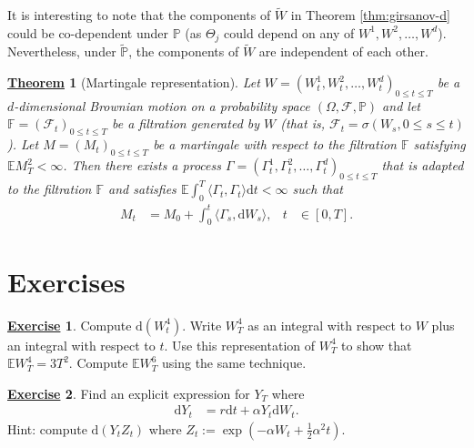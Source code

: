 \documentclass[12pt]{book}
\numberwithin{equation}{chapter}
\theoremstyle{plain}
\newtheorem{theorem}{\underline{Theorem}}
\numberwithin{theorem}{section}
\theoremstyle{definition}
\newtheorem{exercise}{\underline{Exercise}}
\numberwithin{exercise}{chapter}
\newcommand{\<}{\langle}
\renewcommand{\>}{\rangle}
\renewcommand{\(}{\left(}
\renewcommand{\)}{\right)}
\renewcommand{\[}{\left[}
\renewcommand{\]}{\right]}
\newcommand\Eb{\mathds{E}}
\newcommand\Fb{\mathds{F}}
\newcommand\Pb{\mathds{P}}
\newcommand\Fc{\mathscr{F}}
\newcommand\Om{\Omega}
\newcommand\sig{\sigma}
\newcommand\Gam{\Gamma}
\newcommand\Pbt{\widetilde{\Pb}}
\newcommand\Wt{\widetilde{W}}
\newcommand\dd{\mathrm{d}}
\begin{document}
\noindent
It is interesting to note that the components of $\Wt$ in Theorem \ref{thm:girsanov-d} could be co-dependent under $\Pb$ (as $\Theta_j$ could depend on any of $W^1, W^2, \ldots, W^d$).  Nevertheless, under $\Pbt$, the components of $\Wt$ are independent of each other.
 
\begin{theorem}[Martingale representation]
\label{thm:martingale.representation-d}
Let $W = (W_t^1,W_t^2,\ldots,W_t^d)_{0 \leq t \leq T}$ be a $d$-dimensional Brownian motion on a probability space $(\Om,\Fc,\Pb)$ and let $\Fb=(\Fc_t)_{0 \leq t \leq T}$ be a filtration generated by $W$ (that is, $\Fc_t = \sig( W_s, 0 \leq s \leq t)$).  Let $M = (M_t)_{0 \leq t \leq T}$ be a martingale with respect to the filtration $\Fb$ satisfying $\Eb M_T^2 < \infty$.  Then there exists a process $\Gam = (\Gam_t^1, \Gam_t^2,\ldots,\Gam_t^d)_{0 \leq t \leq T}$ that is adapted to the filtration $\Fb$ and satisfies $\Eb \int_0^T \< \Gam_t, \Gam_t \> \dd t < \infty$ such that
\begin{align}
M_t
	&=	M_0 + \int_0^t \< \Gam_s , \dd W_s \> , &
t
	&\in [0,T] .
\end{align}
\end{theorem}


\section{Exercises}
\label{sec:exercises-8}

\begin{exercise}
\label{exer:8.1}
Compute $\dd (W_t^4)$.  Write $W_T^4$ as an integral with respect to $W$ plus an integral with respect to $t$.  Use this representation of $W_T^4$ to show that $\Eb W_T^4 = 3 T^2$.  Compute $\Eb W_T^6$ using the same technique.
\end{exercise}

\begin{exercise}
\label{exer:8.2}
Find an explicit expression for $Y_T$ where
\begin{align}
\dd Y_t
	&=	r \dd t + \alpha Y_t \dd W_t .
\end{align}
Hint: compute $\dd( Y_t Z_t)$ where $Z_t := \exp ( - \alpha W_t + \tfrac{1}{2} \alpha^2 t )$.
\end{exercise}
\end{document}
